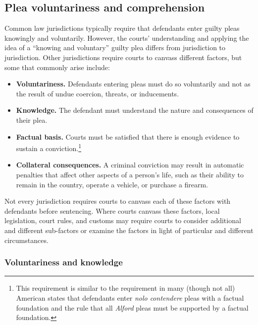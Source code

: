 \subsection{Plea voluntariness and comprehension}

Common law jurisdictions typically require that defendants enter guilty pleas knowingly and voluntarily. However, the courts' understanding and applying the idea of a ``knowing and voluntary'' guilty plea differs from jurisdiction to jurisdiction. Other jurisdictions require courts to canvass different factors, but some that commonly arise include:

\begin{itemize}
\item \textbf{Voluntariness.} Defendants entering pleas must do so voluntarily and not as the result of undue coercion, threats, or inducements.
\item \textbf{Knowledge.} The defendant must understand the nature and consequences of their plea.
\item \textbf{Factual basis.} Courts must be satisfied that there is enough evidence to sustain a conviction.\footnote{This requirement is similar to the requirement in many (though not all) American states that defendants enter \textit{nolo contendere} pleas with a factual foundation and the rule that all \textit{Alford} pleas must be supported by a factual foundation.}
\item \textbf{Collateral consequences.} A criminal conviction may result in automatic penalties that affect other aspects of a person's life, such as their ability to remain in the country, operate a vehicle, or purchase a firearm.
\end{itemize}

Not every jurisdiction requires courts to canvass each of these factors with defendants before sentencing. Where courts canvass these factors, local legislation, court rules, and customs may require courts to consider additional and different sub-factors or examine the factors in light of particular and different circumstances. 

\subsubsection{Voluntariness and knowledge}

